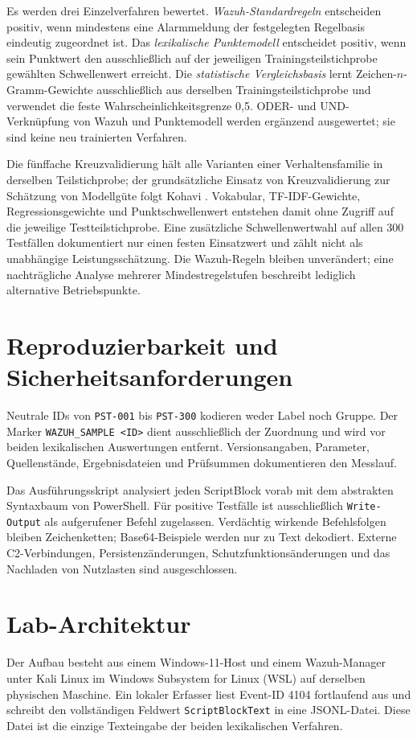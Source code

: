\documentclass[12pt,a4paper,oneside,parskip=half]{scrreprt}
\begin{document}
Es werden drei Einzelverfahren bewertet. \emph{Wazuh-Standardregeln} entscheiden positiv, wenn mindestens eine Alarmmeldung der festgelegten Regelbasis eindeutig zugeordnet ist. Das \emph{lexikalische Punktemodell} entscheidet positiv, wenn sein Punktwert den ausschließlich auf der jeweiligen Trainingsteilstichprobe gewählten Schwellenwert erreicht. Die \emph{statistische Vergleichsbasis} lernt Zeichen-\(n\)-Gramm-Gewichte ausschließlich aus derselben Trainingsteilstichprobe und verwendet die feste Wahrscheinlichkeitsgrenze 0{,}5. ODER- und UND-Verknüpfung von Wazuh und Punktemodell werden ergänzend ausgewertet; sie sind keine neu trainierten Verfahren.

Die fünffache Kreuzvalidierung hält alle Varianten einer Verhaltensfamilie in derselben Teilstichprobe; der grundsätzliche Einsatz von Kreuzvalidierung zur Schätzung von Modellgüte folgt Kohavi \cite{kohavi1995}. Vokabular, TF-IDF-Gewichte, Regressionsgewichte und Punktschwellenwert entstehen damit ohne Zugriff auf die jeweilige Testteilstichprobe. Eine zusätzliche Schwellenwertwahl auf allen 300 Testfällen dokumentiert nur einen festen Einsatzwert und zählt nicht als unabhängige Leistungsschätzung. Die Wazuh-Regeln bleiben unverändert; eine nachträgliche Analyse mehrerer Mindestregelstufen beschreibt lediglich alternative Betriebspunkte.
\section{Reproduzierbarkeit und Sicherheitsanforderungen}
Neutrale IDs von \texttt{PST-001} bis \texttt{PST-300} kodieren weder Label noch Gruppe. Der Marker \texttt{WAZUH\_SAMPLE <ID>} dient ausschließlich der Zuordnung und wird vor beiden lexikalischen Auswertungen entfernt. Versionsangaben, Parameter, Quellenstände, Ergebnisdateien und Prüfsummen dokumentieren den Messlauf.

Das Ausführungsskript analysiert jeden ScriptBlock vorab mit dem abstrakten Syntaxbaum von PowerShell. Für positive Testfälle ist ausschließlich \texttt{Write-Output} als aufgerufener Befehl zugelassen. Verdächtig wirkende Befehlsfolgen bleiben Zeichenketten; Base64-Beispiele werden nur zu Text dekodiert. Externe C2-Verbindungen, Persistenzänderungen, Schutzfunktionsänderungen und das Nachladen von Nutzlasten sind ausgeschlossen.

\section{Lab-Architektur}
Der Aufbau besteht aus einem Windows-11-Host und einem Wazuh-Manager unter Kali Linux im Windows Subsystem for Linux (WSL) auf derselben physischen Maschine. Ein lokaler Erfasser liest Event-ID 4104 fortlaufend aus  und schreibt den vollständigen Feldwert \texttt{ScriptBlockText} in eine JSONL-Datei. Diese Datei ist die einzige Texteingabe der beiden lexikalischen Verfahren.
\end{document}
